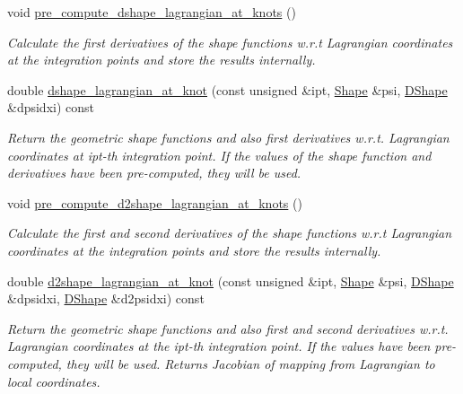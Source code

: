 \begin{DoxyCompactItemize}
void \hyperlink{classoomph_1_1StorableShapeSolidElementBase_a501f9f5b1d42e75de4bf6efaa86cf14a}{pre\+\_\+compute\+\_\+dshape\+\_\+lagrangian\+\_\+at\+\_\+knots} ()
\begin{DoxyCompactList}\small\item\em Calculate the first derivatives of the shape functions w.\+r.\+t Lagrangian coordinates at the integration points and store the results internally. \end{DoxyCompactList}\item 
double \hyperlink{classoomph_1_1StorableShapeSolidElementBase_a69eefa335919d8d4b5143bb11b40c2df}{dshape\+\_\+lagrangian\+\_\+at\+\_\+knot} (const unsigned \&ipt, \hyperlink{classoomph_1_1Shape}{Shape} \&psi, \hyperlink{classoomph_1_1DShape}{D\+Shape} \&dpsidxi) const
\begin{DoxyCompactList}\small\item\em Return the geometric shape functions and also first derivatives w.\+r.\+t. Lagrangian coordinates at ipt-\/th integration point. If the values of the shape function and derivatives have been pre-\/computed, they will be used. \end{DoxyCompactList}\item 
void \hyperlink{classoomph_1_1StorableShapeSolidElementBase_a3f1b400868aa398cedc57e01d1eb1a24}{pre\+\_\+compute\+\_\+d2shape\+\_\+lagrangian\+\_\+at\+\_\+knots} ()
\begin{DoxyCompactList}\small\item\em Calculate the first and second derivatives of the shape functions w.\+r.\+t Lagrangian coordinates at the integration points and store the results internally. \end{DoxyCompactList}\item 
double \hyperlink{classoomph_1_1StorableShapeSolidElementBase_a55f3ab1f51572cf77e374e4917f47f2b}{d2shape\+\_\+lagrangian\+\_\+at\+\_\+knot} (const unsigned \&ipt, \hyperlink{classoomph_1_1Shape}{Shape} \&psi, \hyperlink{classoomph_1_1DShape}{D\+Shape} \&dpsidxi, \hyperlink{classoomph_1_1DShape}{D\+Shape} \&d2psidxi) const
\begin{DoxyCompactList}\small\item\em Return the geometric shape functions and also first and second derivatives w.\+r.\+t. Lagrangian coordinates at the ipt-\/th integration point. If the values have been pre-\/computed, they will be used. Returns Jacobian of mapping from Lagrangian to local coordinates. \end{DoxyCompactList}\item 

\end{DoxyCompactItemize}
